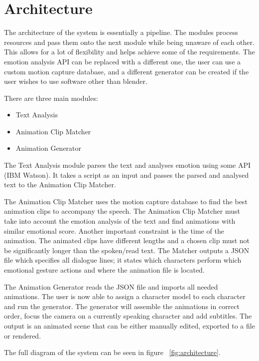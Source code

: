 \section{Architecture}

The architecture of the system is essentially a pipeline. The modules process resources and pass them onto the next module while being unaware of each other. This allows for a lot of flexibility and helps achieve some of the requirements. The emotion analysis API can be replaced with a different one, the user can use a custom motion capture database, and a different generator can be created if the user wishes to use software other than blender.


There are three main modules:
\begin{itemize}
\item Text Analysis
\item Animation Clip Matcher
\item Animation Generator
\end{itemize}

The Text Analysis module parses the text and analyses emotion using some API (IBM Watson). It takes a script as an input and passes the parsed and analysed text to the Animation Clip Matcher.

The Animation Clip Matcher uses the motion capture database to find the best animation clips to accompany the speech. The Animation Clip Matcher must take into account the emotion analysis of the text and find animations with similar emotional score. Another important constraint is the time of the animation. The animated clips have different lengths and a chosen clip must not be significantly longer than the spoken/read text. The Matcher outputs a JSON file which specifies all dialogue lines; it states which characters perform which emotional gesture actions and where the animation file is located.

The Animation Generator reads the JSON file and imports all needed animations. The user is now able to assign a character model to each character and run the generator. The generator will assemble the animations in correct order, focus the camera on a currently speaking character and add subtitles. The output is an animated scene that can be either manually edited, exported to a file or rendered.

The full diagram of the system can be seen in figure ~\ref{fig:architecture}.

